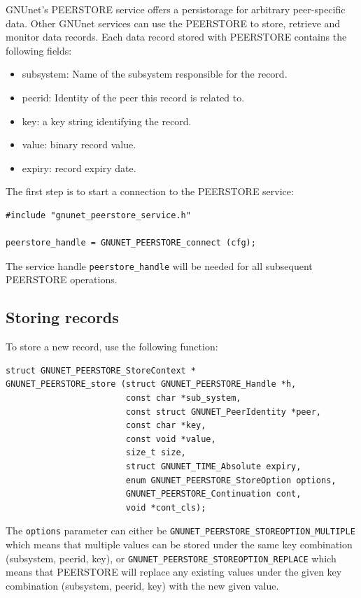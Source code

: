 \documentclass[10pt]{article}
\begin{document}
GNUnet's PEERSTORE service offers a persistorage for arbitrary peer-specific data.
Other GNUnet services can use the PEERSTORE to store, retrieve and monitor data records.
Each data record stored with PEERSTORE contains the following fields:

\begin{itemize}
\itemsep0em
  \item subsystem: Name of the subsystem responsible for the record.
  \item peerid: Identity of the peer this record is related to.
  \item key: a key string identifying the record.
  \item value: binary record value.
  \item expiry: record expiry date.
\end{itemize}

The first step is to start a connection to the PEERSTORE service:
\begin{lstlisting}
#include "gnunet_peerstore_service.h"

peerstore_handle = GNUNET_PEERSTORE_connect (cfg);
\end{lstlisting}
The service handle \lstinline|peerstore_handle| will be needed for all subsequent
PEERSTORE operations.

\subsection{Storing records}

To store a new record, use the following function:
\begin{lstlisting}
struct GNUNET_PEERSTORE_StoreContext *
GNUNET_PEERSTORE_store (struct GNUNET_PEERSTORE_Handle *h,
                        const char *sub_system,
                        const struct GNUNET_PeerIdentity *peer,
                        const char *key,
                        const void *value,
                        size_t size,
                        struct GNUNET_TIME_Absolute expiry,
                        enum GNUNET_PEERSTORE_StoreOption options,
                        GNUNET_PEERSTORE_Continuation cont,
                        void *cont_cls);
\end{lstlisting}

The \lstinline|options| parameter can either be \lstinline|GNUNET_PEERSTORE_STOREOPTION_MULTIPLE|
which means that multiple values can be stored under the same key combination (subsystem, peerid, key),
or \lstinline|GNUNET_PEERSTORE_STOREOPTION_REPLACE| which means that PEERSTORE will replace any
existing values under the given key combination (subsystem, peerid, key) with the new given value.
\end{document}
